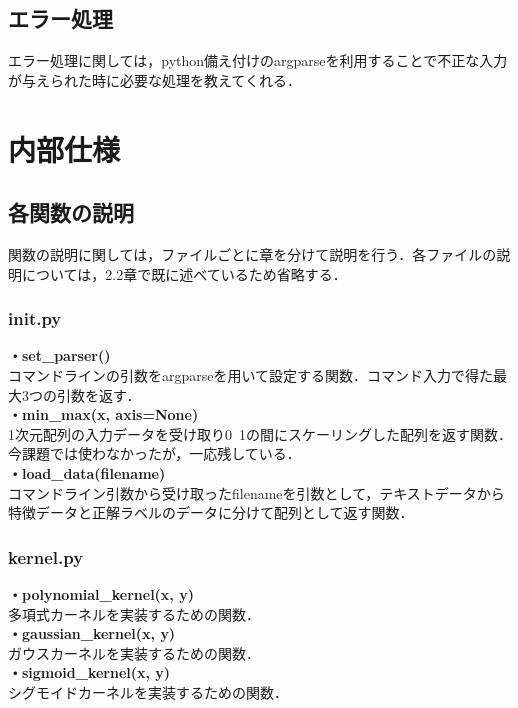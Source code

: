 \documentclass[11pt]{article}
\begin{document}
\subsection{エラー処理}
エラー処理に関しては，python備え付けのargparseを利用することで不正な入力が与えられた時に必要な処理を教えてくれる．

\section{内部仕様}
\subsection{各関数の説明}
関数の説明に関しては，ファイルごとに章を分けて説明を行う．各ファイルの説明については，2.2章で既に述べているため省略する．
\subsubsection{init.py}
\noindent \textbf{・set\_parser()}\\
コマンドラインの引数をargparseを用いて設定する関数．コマンド入力で得た最大3つの引数を返す．\vspace{5pt}\\
\textbf{・min\_max(x, axis=None)}\\
1次元配列の入力データを受け取り0~1の間にスケーリングした配列を返す関数．今課題では使わなかったが，一応残している．\vspace{5pt}\\
\textbf{・load\_data(filename)}\\
コマンドライン引数から受け取ったfilenameを引数として，テキストデータから特徴データと正解ラベルのデータに分けて配列として返す関数． \vspace{5pt}\\

\subsubsection{kernel.py}
\noindent\textbf{・polynomial\_kernel(x, y)}\\
多項式カーネルを実装するための関数．\vspace{5pt}\\
\textbf{・gaussian\_kernel(x, y)}\\
ガウスカーネルを実装するための関数．\vspace{5pt}\\
\textbf{・sigmoid\_kernel(x, y)}\\
シグモイドカーネルを実装するための関数．\vspace{5pt}\\
\end{document}
